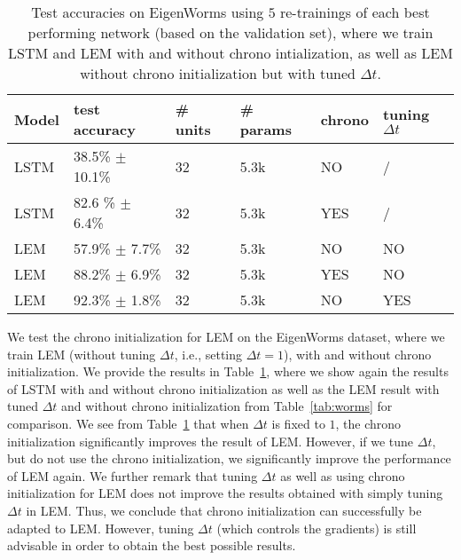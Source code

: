 \documentclass{article} \usepackage{iclr2022_conference,times}
\newcommand{\Dt}{{\Delta t}}
\newcommand{\Tref}[1]{Table~\ref{#1}}
\begin{document}
\begin{table}[h!]
\caption{Test accuracies on EigenWorms using $5$ re-trainings of each best performing network (based on the validation set), where we train LSTM and LEM with and without chrono intialization, as well as LEM without chrono initialization but with tuned $\Dt$.}
\label{tab:worms_chrono}
\centering
\begin{tabular}{llllll}
\toprule
\cmidrule(r){1-6}
Model &  test accuracy & \# units & \# params & chrono & tuning $\Dt$\\
\midrule
LSTM & 38.5\% $\pm$ 10.1\% & 32 & 5.3k & NO & / \\
LSTM & 82.6 \% $\pm$ 6.4\% & 32 & 5.3k & YES & / \\
LEM & 57.9\% $\pm$ 7.7\% & 32 & 5.3k & NO & NO \\
LEM & 88.2\% $\pm$ 6.9\% & 32 & 5.3k & YES & NO \\
LEM & 92.3\% $\pm$ 1.8\% & 32 & 5.3k & NO & YES \\
    \bottomrule
  \end{tabular}
\end{table}

We test the chrono initialization for LEM on the EigenWorms dataset, where we train LEM (without tuning $\Dt$, i.e., setting $\Dt=1$), with and without chrono initialization. We provide the results in \Tref{tab:worms_chrono}, where we show again the results of LSTM with and without chrono initialization as well as the LEM result with tuned $\Dt$ and without chrono initialization from \Tref{tab:worms} for comparison. 
We see from \Tref{tab:worms_chrono} that when $\Dt$ is fixed to $1$, the chrono initialization significantly improves the result of LEM. However, if we tune $\Dt$, but do not use the chrono initialization, we significantly improve the performance of LEM again. We further remark that tuning $\Dt$ as well as using chrono initialization for LEM does not improve the results obtained with simply tuning $\Dt$ in LEM. Thus, we conclude that chrono initialization can successfully be adapted to LEM. However, tuning $\Dt$ (which controls the gradients) is still advisable in order to obtain the best possible results.
\end{document}
